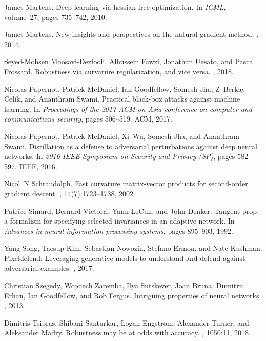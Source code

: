 \documentclass{article}
\theoremstyle{plain}
\theoremstyle{definition}
\theoremstyle{remark}
\begin{document}
\begin{thebibliography}{10}
James Martens.
\newblock Deep learning via hessian-free optimization.
\newblock In {\em ICML}, volume~27, pages 735--742, 2010.

James Martens.
\newblock New insights and perspectives on the natural gradient method.
, 2014.

Seyed-Mohsen Moosavi-Dezfooli, Alhussein Fawzi, Jonathan Uesato, and Pascal
  Frossard.
\newblock Robustness via curvature regularization, and vice versa.
, 2018.

Nicolas Papernot, Patrick McDaniel, Ian Goodfellow, Somesh Jha, Z~Berkay Celik,
  and Ananthram Swami.
\newblock Practical black-box attacks against machine learning.
\newblock In {\em Proceedings of the 2017 ACM on Asia conference on computer
  and communications security}, pages 506--519. ACM, 2017.

Nicolas Papernot, Patrick McDaniel, Xi~Wu, Somesh Jha, and Ananthram Swami.
\newblock Distillation as a defense to adversarial perturbations against deep
  neural networks.
\newblock In {\em 2016 IEEE Symposium on Security and Privacy (SP)}, pages
  582--597. IEEE, 2016.

Nicol~N Schraudolph.
\newblock Fast curvature matrix-vector products for second-order gradient
  descent.
, 14(7):1723--1738, 2002.

Patrice Simard, Bernard Victorri, Yann LeCun, and John Denker.
\newblock Tangent prop-a formalism for specifying selected invariances in an
  adaptive network.
\newblock In {\em Advances in neural information processing systems}, pages
  895--903, 1992.

Yang Song, Taesup Kim, Sebastian Nowozin, Stefano Ermon, and Nate Kushman.
\newblock Pixeldefend: Leveraging generative models to understand and defend
  against adversarial examples.
, 2017.

Christian Szegedy, Wojciech Zaremba, Ilya Sutskever, Joan Bruna, Dumitru Erhan,
  Ian Goodfellow, and Rob Fergus.
\newblock Intriguing properties of neural networks.
, 2013.

Dimitris Tsipras, Shibani Santurkar, Logan Engstrom, Alexander Turner, and
  Aleksander Madry.
\newblock Robustness may be at odds with accuracy.
, 1050:11, 2018.


\end{thebibliography}
\end{document}
